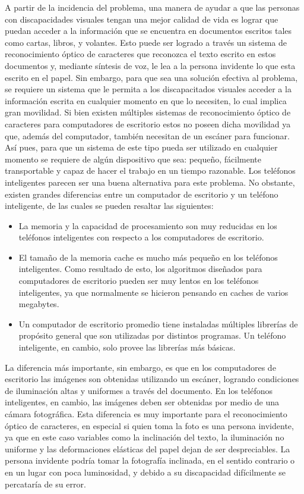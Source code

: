 \documentclass[a4paper, 11pt, oneside]{report}
\begin{document}
A partir de la incidencia del problema, una manera de ayudar a que las personas con discapacidades visuales tengan una mejor calidad de vida es lograr que puedan acceder a la información que se encuentra en documentos escritos tales como cartas, libros, y volantes. Esto puede ser logrado a través un sistema de reconocimiento óptico de caracteres que reconozca el texto escrito en estos documentos y, mediante síntesis de voz, le lea a la persona invidente lo que esta escrito en el papel. Sin embargo, para que sea una solución efectiva al problema, se requiere un sistema que le permita a los discapacitados visuales acceder a la información escrita en cualquier momento en que lo necesiten, lo cual implica gran movilidad. Si bien existen múltiples sistemas de reconocimiento óptico de caracteres para computadores de escritorio estos no poseen dicha movilidad ya que, además del computador, también necesitan de un escáner para funcionar. Así pues, para que un sistema de este tipo pueda ser utilizado en cualquier momento se requiere de algún dispositivo que sea: pequeño, fácilmente transportable y capaz de hacer el trabajo en un tiempo razonable. Los teléfonos inteligentes parecen ser una buena alternativa para este problema. No obstante, existen grandes diferencias entre un computador de escritorio y un teléfono inteligente, de las cuales se pueden resaltar las siguientes:

	\begin{itemize}

	\item La memoria y la capacidad de procesamiento son muy reducidas en los teléfonos inteligentes con respecto a los computadores de escritorio.

	\item El tamaño de la memoria cache es mucho más pequeño en los teléfonos inteligentes. Como resultado de esto, los algoritmos diseñados para computadores de escritorio pueden ser muy lentos en los teléfonos inteligentes, ya que normalmente se hicieron pensando en caches de varios megabytes.

	\item Un computador de escritorio promedio tiene instaladas múltiples librerías de propósito general que son utilizadas por distintos programas. Un teléfono inteligente, en cambio, solo provee las librerías más básicas.

	\end{itemize}

La diferencia más importante, sin embargo, es que en los computadores de escritorio las imágenes son obtenidas utilizando un escáner, logrando condiciones de iluminación altas y uniformes a través del documento. En los teléfonos inteligentes, en cambio, las imágenes deben ser obtenidas por medio de una cámara fotográfica. Esta diferencia es muy importante para el reconocimiento óptico de caracteres, en especial si quien toma la foto es una persona invidente, ya que en este caso variables como la inclinación del texto, la iluminación no uniforme y las deformaciones elásticas del papel dejan de ser despreciables. La persona invidente podría tomar la fotografía inclinada, en el sentido contrario o en un lugar con poca luminosidad, y debido a su discapacidad difícilmente se percataría de su error.
\end{document}
